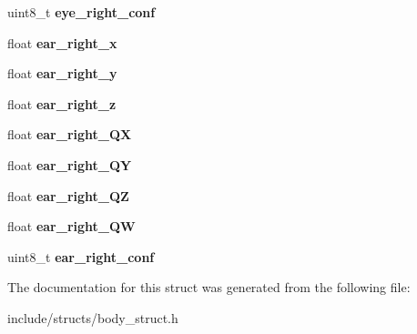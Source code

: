 \begin{DoxyCompactItemize}
uint8\+\_\+t {\bfseries eye\+\_\+right\+\_\+conf}
\item 
\mbox{\label{structmoetsi_1_1ssp_1_1object__human__t_ac84ca5b8a81506892b1fe1a357d63729}} 
float {\bfseries ear\+\_\+right\+\_\+x}
\item 
\mbox{\label{structmoetsi_1_1ssp_1_1object__human__t_af2d46588c3b6919268551e5aadd45eab}} 
float {\bfseries ear\+\_\+right\+\_\+y}
\item 
\mbox{\label{structmoetsi_1_1ssp_1_1object__human__t_a7981b4ab429cac3d24f0a1bab2e1c300}} 
float {\bfseries ear\+\_\+right\+\_\+z}
\item 
\mbox{\label{structmoetsi_1_1ssp_1_1object__human__t_a8be4527844e44e1a1f4948b911d6b846}} 
float {\bfseries ear\+\_\+right\+\_\+\+QX}
\item 
\mbox{\label{structmoetsi_1_1ssp_1_1object__human__t_a93e963d998bd56018cb063c661bc751e}} 
float {\bfseries ear\+\_\+right\+\_\+\+QY}
\item 
\mbox{\label{structmoetsi_1_1ssp_1_1object__human__t_a9eb2b389cafaa6a62dbfa116efe09643}} 
float {\bfseries ear\+\_\+right\+\_\+\+QZ}
\item 
\mbox{\label{structmoetsi_1_1ssp_1_1object__human__t_ad74874294fa56b2f5514f38b34044454}} 
float {\bfseries ear\+\_\+right\+\_\+\+QW}
\item 
\mbox{\label{structmoetsi_1_1ssp_1_1object__human__t_a3c9c3f57de6c5ff547b53b30b8a2ae93}} 
uint8\+\_\+t {\bfseries ear\+\_\+right\+\_\+conf}
\end{DoxyCompactItemize}


The documentation for this struct was generated from the following file\+:\begin{DoxyCompactItemize}
\item 
include/structs/body\+\_\+struct.\+h\end{DoxyCompactItemize}
